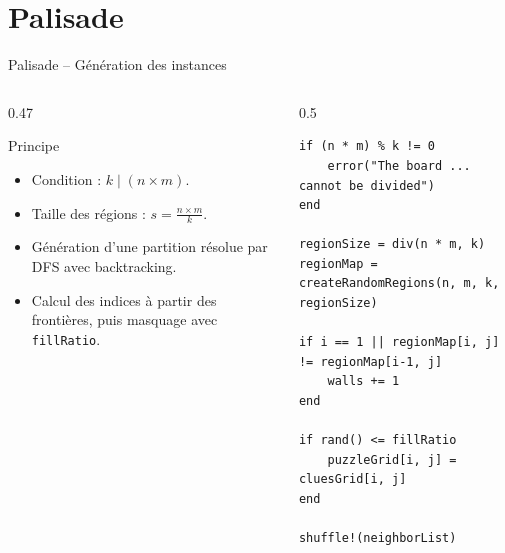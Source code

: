 \documentclass[11pt,aspectratio=169]{beamer}
\begin{document}
\section{Palisade}

\begin{frame}[fragile]{Palisade -- Génération des instances}
\small
\begin{columns}[T,onlytextwidth]
\begin{column}{0.47\textwidth}
\begin{block}{Principe}
\begin{itemize}
  \item Condition : \(k \mid (n \times m)\).
  \item Taille des régions : \(s = \frac{n \times m}{k}\).
  \item Génération d'une partition résolue par DFS avec backtracking.
  \item Calcul des indices à partir des frontières, puis masquage avec \texttt{fillRatio}.
\end{itemize}
\end{block}
\end{column}
\begin{column}{0.5\textwidth}
\begin{lstlisting}[basicstyle=\ttfamily\tiny]
if (n * m) % k != 0
    error("The board ... cannot be divided")
end

regionSize = div(n * m, k)
regionMap = createRandomRegions(n, m, k, regionSize)

if i == 1 || regionMap[i, j] != regionMap[i-1, j]
    walls += 1
end

if rand() <= fillRatio
    puzzleGrid[i, j] = cluesGrid[i, j]
end

shuffle!(neighborList)
\end{lstlisting}
\end{column}
\end{columns}
\end{frame}
\end{document}
